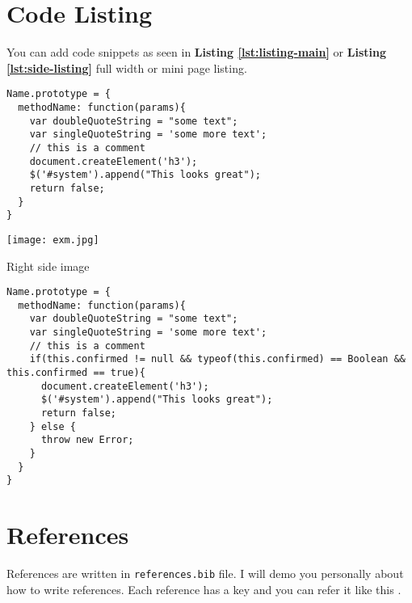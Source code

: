 \section{Code Listing}
\label{sec:code-listing}

You can add code snippets as seen in \textbf{Listing \ref{lst:listing-main}} or \textbf{Listing \ref{lst:side-listing}} full width or mini page listing.

\begin{minipage}{.5\textwidth}
\begin{lstlisting}[caption=My Javascript Example]
Name.prototype = {
  methodName: function(params){
    var doubleQuoteString = "some text";
    var singleQuoteString = 'some more text';
    // this is a comment
    document.createElement('h3');
    $('#system').append("This looks great");
    return false;
  }
}
\end{lstlisting}
\label{lst:side-listing}
\end{minipage}%
\begin{minipage}{0.5\textwidth}
	\centering
	\texttt{[image: exm.jpg]}
	\caption{Right side image}
	\label{fig:right-side-minipage}
\end{minipage}

\begin{lstlisting}[caption=JS Code Snippet]
Name.prototype = {
  methodName: function(params){
    var doubleQuoteString = "some text";
    var singleQuoteString = 'some more text';
    // this is a comment
    if(this.confirmed != null && typeof(this.confirmed) == Boolean && this.confirmed == true){
      document.createElement('h3');
      $('#system').append("This looks great");
      return false;
    } else {
      throw new Error;
    }
  }
}
\end{lstlisting}
\label{lst:listing-main}

\section{References}
References are written in \texttt{references.bib} file. I will demo you personally about how to write references. Each reference has a key and you can refer it like this \cite{Belk:2014}.\\

